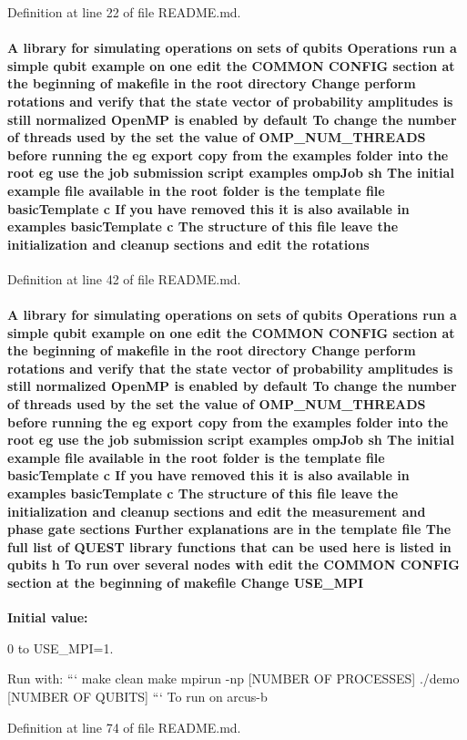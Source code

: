 Definition at line 22 of file README.md.\hypertarget{README_8md_a168d0f076329da35a2b080049c35cecd}{
\paragraph[{rotations}]{\setlength{\rightskip}{0pt plus 5cm}A library for simulating operations on sets of qubits Operations run a simple qubit example on one edit the COMMON CONFIG section at the beginning of makefile in the root directory Change perform {\bf rotations} and verify that the state vector of probability amplitudes {\bf is} still normalized OpenMP {\bf is} enabled by default To change the number of threads used by the set the value of {\bf OMP\_\-NUM\_\-THREADS} before running the {\bf eg} export copy from the examples {\bf folder} into the root {\bf eg} use the job submission script examples ompJob sh The initial example {\bf file} available in the root {\bf folder} {\bf is} the template {\bf file} basicTemplate c If you have removed this it {\bf is} also available in examples basicTemplate c The structure of this {\bf file} leave the initialization and cleanup sections and edit the {\bf rotations}}\hfill}
\label{README_8md_a168d0f076329da35a2b080049c35cecd}


Definition at line 42 of file README.md.\hypertarget{README_8md_a0da642c7a89d38d17508c3eea1b45015}{
\paragraph[{USE\_\-MPI}]{\setlength{\rightskip}{0pt plus 5cm}A library for simulating operations on sets of qubits Operations run a simple qubit example on one edit the COMMON CONFIG section at the beginning of makefile in the root directory Change perform {\bf rotations} and verify that the state vector of probability amplitudes {\bf is} still normalized OpenMP {\bf is} enabled by default To change the number of threads used by the set the value of {\bf OMP\_\-NUM\_\-THREADS} before running the {\bf eg} export copy from the examples {\bf folder} into the root {\bf eg} use the job submission script examples ompJob sh The initial example {\bf file} available in the root {\bf folder} {\bf is} the template {\bf file} basicTemplate c If you have removed this it {\bf is} also available in examples basicTemplate c The structure of this {\bf file} leave the initialization and cleanup sections and edit the measurement and phase gate sections Further explanations are in the template {\bf file} The full list of QUEST library functions that can be used here {\bf is} listed in qubits h To run over several nodes with edit the COMMON CONFIG section at the beginning of makefile Change {\bf USE\_\-MPI}}\hfill}
\label{README_8md_a0da642c7a89d38d17508c3eea1b45015}
{\bfseries Initial value:}
\begin{DoxyCode}
0 to USE_MPI=1.

Run with:
```
make clean
make
mpirun -np [NUMBER OF PROCESSES] ./demo [NUMBER OF QUBITS]
```
To run on arcus-b
\end{DoxyCode}


Definition at line 74 of file README.md.